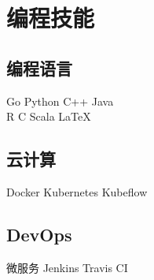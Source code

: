 \documentclass[]{deedy-resume-openfont}
\begin{document}
\begin{minipage}[t]{0.68\textwidth}

% 
% 

\end{minipage}

\newpage
\pagestyle{fancy}
\fancyhf{}


\begin{minipage}[t]{0.3\textwidth}


\section{编程技能}
\sectionsep
\subsection{编程语言}
Go \textbullet{} Python \textbullet{} C++ \textbullet{} Java \\
R \textbullet{} C \textbullet{} Scala \textbullet{} \LaTeX\ \\
\sectionsep

\subsection{云计算}
Docker \textbullet{} Kubernetes \textbullet{} Kubeflow \\
\sectionsep

\subsection{DevOps}
微服务 \textbullet{} Jenkins \textbullet{} Travis CI  \\
\sectionsep

\end{minipage}
\hfill
\end{document}
